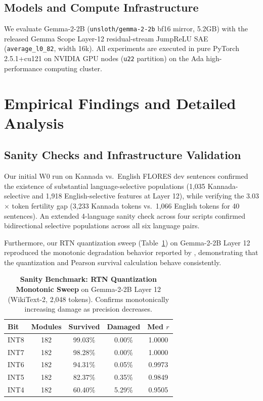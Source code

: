 \documentclass[11pt]{article}
\begin{document}
\subsection{Models and Compute Infrastructure}
We evaluate Gemma-2-2B (\texttt{unsloth/gemma-2-2b} bf16 mirror, 5.2GB) with the released Gemma Scope Layer-12 residual-stream JumpReLU SAE (\texttt{average\_l0\_82}, width 16k). All experiments are executed in pure PyTorch 2.5.1+cu121 on NVIDIA GPU nodes (\texttt{u22} partition) on the Ada high-performance computing cluster.

\section{Empirical Findings and Detailed Analysis}

\subsection{Sanity Checks and Infrastructure Validation}
Our initial W0 run on Kannada vs.\ English FLORES dev sentences confirmed the existence of substantial language-selective populations (1,035 Kannada-selective and 1,918 English-selective features at Layer 12), while verifying the 3.03$\times$ token fertility gap (3,233 Kannada tokens vs.\ 1,066 English tokens for 40 sentences). An extended 4-language sanity check across four scripts confirmed bidirectional selective populations across all six language pairs.

Furthermore, our RTN quantization sweep (Table~\ref{tab:rtn_sweep}) on Gemma-2-2B Layer 12 reproduced the monotonic degradation behavior reported by \citet{duan2026perplexity}, demonstrating that the quantization and Pearson survival calculation behave consistently.

\begin{table}[!htbp]
\centering
\small
\setlength{\tabcolsep}{4.5pt}
\begin{tabular}{lcccc}
\toprule
\textbf{Bit} & \textbf{Modules} & \textbf{Survived} & \textbf{Damaged} & \textbf{Med $r$} \\
\midrule
INT8 & 182 & 99.03\% & 0.00\% & 1.0000 \\
INT7 & 182 & 98.28\% & 0.00\% & 1.0000 \\
INT6 & 182 & 94.31\% & 0.05\% & 0.9973 \\
INT5 & 182 & 82.37\% & 0.35\% & 0.9849 \\
INT4 & 182 & 60.40\% & 5.29\% & 0.9505 \\
\bottomrule
\end{tabular}
\caption{\textbf{Sanity Benchmark: RTN Quantization Monotonic Sweep} on Gemma-2-2B Layer 12 (WikiText-2, 2,048 tokens). Confirms monotonically increasing damage as precision decreases.}
\label{tab:rtn_sweep}
\end{table}
\end{document}
